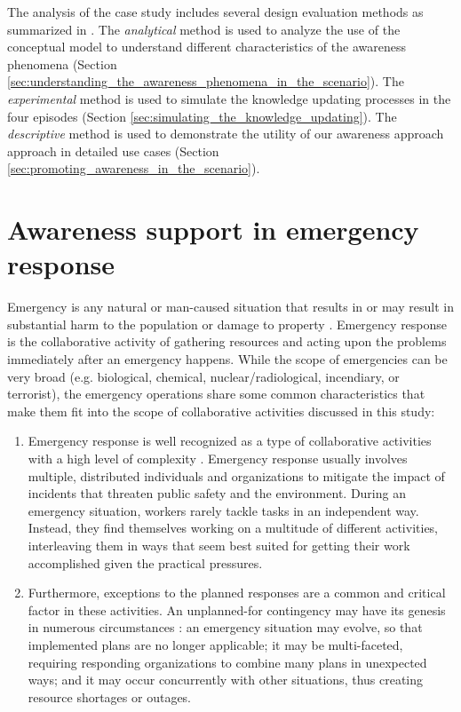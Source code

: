 The analysis of the case study includes several design evaluation methods as summarized in \cite{Hevner2004}. The \emph{analytical} method is used to analyze the use of the conceptual model to understand different characteristics of the awareness phenomena (Section \ref{sec:understanding_the_awareness_phenomena_in_the_scenario}). The \emph{experimental} method is used to simulate the knowledge updating processes in the four episodes (Section \ref{sec:simulating_the_knowledge_updating}). The \emph{descriptive} method is used to demonstrate the utility of our awareness approach approach in detailed use cases (Section \ref{sec:promoting_awareness_in_the_scenario}). 

\section{Awareness support in emergency response} %
\label{sec:awareness_support_in_emergency_response}
Emergency is any natural or man-caused situation that results in or may result in substantial harm to the population or damage to property \cite{shen2004managing}. Emergency response is the collaborative activity of gathering resources and acting upon the problems immediately after an emergency happens. While the scope of emergencies can be very broad (e.g. biological, chemical, nuclear/radiological, incendiary, or terrorist), the emergency operations share some common characteristics that make them fit into the scope of collaborative activities discussed in this study:

\begin{enumerate}
	\item Emergency response is well recognized as a type of collaborative activities with a high level of complexity \cite{Turoff2004}. Emergency response usually involves multiple, distributed individuals and organizations to mitigate the impact of incidents that threaten public safety and the environment. During an emergency situation, workers rarely tackle tasks in an independent way. Instead, they find themselves working on a multitude of different activities, interleaving them in ways that seem best suited for getting their work accomplished given the practical pressures.
	\item Furthermore, exceptions to the planned responses are a common and critical factor in these activities. An unplanned-for contingency may have its genesis in numerous circumstances \cite{Mendonca2004}: an emergency situation may evolve, so that implemented plans are no longer applicable; it may be multi-faceted, requiring responding organizations to combine many plans in unexpected ways; and it may occur concurrently with other situations, thus creating resource shortages or outages.
\end{enumerate}

